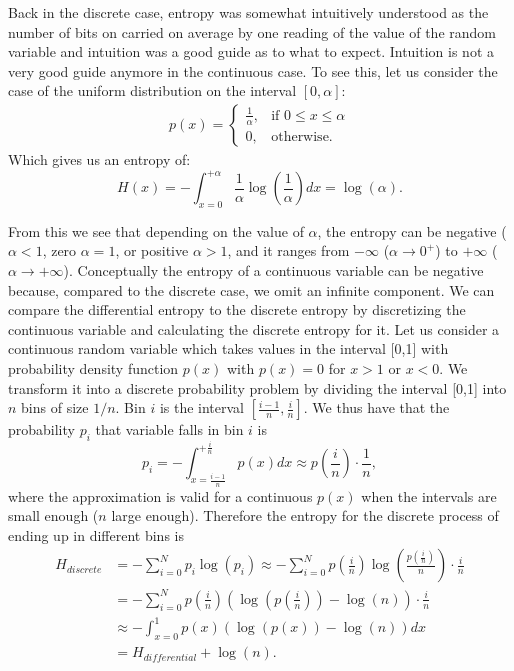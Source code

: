 \documentclass[]{article}
\begin{document}
Back in the discrete case, entropy was somewhat intuitively understood as the number of bits on carried on average by one reading of the value of the random variable and intuition was a good guide as to what to expect. Intuition is not a very good guide anymore in the continuous case. To see this, let us consider the case of the uniform distribution on the interval $[0,\alpha]$:
\begin{align}
\label{uniformdist}
  p(x) = \begin{cases}
    \frac{1}{\alpha}, & \text{if $0 \leq x \leq \alpha$}\\
    0, & \text{otherwise.}
\end{cases}
\end{align}
Which gives us an entropy of: 
\begin{equation}
\label{eq:uniH}
H(x) =  -\int_{x=0}^{+\alpha} \frac{1}{\alpha} \log(\frac{1}{\alpha}) dx  = \log(\alpha) .
\end{equation}

From this we see that depending on the value of $\alpha$, the entropy can be negative ($\alpha < 1$, zero $\alpha = 1$, or positive $\alpha > 1$, and it ranges from $-\infty$ ($\alpha \rightarrow 0^+$) to $+\infty$ ($\alpha \rightarrow +\infty$).  Conceptually the entropy of a continuous variable can be negative because, compared to the discrete case, we omit an infinite component.  We can compare the differential entropy to the discrete entropy by discretizing the continuous variable and calculating the discrete entropy for it. Let us consider a continuous random variable which takes values in the interval [0,1] with probability density function $p(x)$ with $p(x) = 0$ for $x>1$ or $x<0$. We transform it into a discrete probability problem by dividing the interval [0,1] into $n$ bins of size $1/n$. Bin $i$ is the interval $[\frac{i-1}{n}, \frac{i}{n}]$. We thus have that the probability $p_i$ that variable falls in bin $i$ is 
\begin{equation}
\label{eq:pi}
p_i =  -\int_{x=\frac{i-1}{n}}^{+\frac{i}{n}} p(x)  dx  \approx p(\frac{i}{n})\cdot\frac{1}{n} ,
\end{equation}
where the approximation is valid for a continuous $p(x)$ when the intervals are small enough ($n$ large enough).  Therefore the entropy for the discrete process of ending up in different bins is 
\begin{align}
\label{eq:Hrel}
H_{discrete} & =  -\sum_{i=0}^N p_i \log(p_i)  \approx -\sum_{i=0}^N p(\frac{i}{n}) \log(\frac{p(\frac{i}{n})}{n})\cdot \frac{i}{n} \\
& =  -\sum_{i=0}^N p(\frac{i}{n}) (\log(p(\frac{i}{n})) -\log(n)) \cdot \frac{i}{n}  \\
& \approx -\int_{x=0}^1 p(x) (\log(p(x)) -\log(n)) dx \\
& = H_{differential} + \log(n) . 
\end{align}
\end{document}
